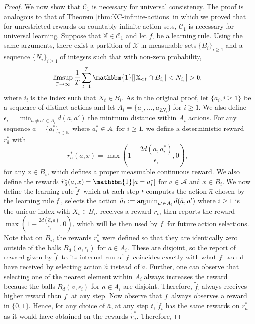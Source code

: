 \documentclass[aos]{imsart}
\theoremstyle{plain}
\theoremstyle{remark}
\newcommand{\Acal}{\mathcal{A}}
\newcommand{\Ccal}{\mathcal{C}}
\newcommand{\Xcal}{\mathcal{X}}
\newcommand{\Nbb}{\mathbb{N}}
\newcommand{\Xbb}{\mathbb{X}}
\newcommand{\1}{\mathbbm{1}}%
\newcommand{\argmin}{\mathop{\rm argmin}}
\renewcommand{\limsup}{\mathop{\rm limsup}}
\begin{document}
\begin{proof}
We now show that $\Ccal_1$ is necessary for universal consistency. The proof is analogous to that of Theorem \ref{thm:KC-infinite-actions} in which we proved that for unrestricted rewards on countably infinite action sets, $\Ccal_1$ is necessary for universal learning. Suppose that $\Xbb\in\Ccal_1$ and let $f_\cdot$ be a learning rule. Using the same arguments, there exist a partition of $\Xcal$ in measurable sets $\{B_i\}_{i\geq 1}$  and a sequence $\{N_i\}_{i\geq 1}$ of integers such that with non-zero probability,
\begin{equation*}
    \limsup_{T\to\infty} \frac{1}{T}\sum_{t=1}^T \1[|\Xbb_{<t}\cap B_{i_t}|<N_{i_t}] >0,
\end{equation*}
where $i_t$ is the index such that $X_t\in B_i$. As in the original proof, let $\{a_i,i\geq 1\}$ be a sequence of distinct actions and let $A_i=\{a_1,\ldots,a_{2N_i}\}$ for $i\geq 1$. We also define $\epsilon_i = \min_{a\neq a' \in A_i} d(a,a')$ the minimum distance within $A_i$ actions. For any sequence $\bar a=\{a_i^*\}_{i\in\Nbb}$ where $a_i^*\in A_i$ for $i\geq 1$, we define a deterministic reward $r^*_{\bar a}$ with
\begin{equation*}
    r^*_{\bar a}(a, x) = \max\left(1-\frac{2 d(a,a^*_i)}{\epsilon_i},0\right),
\end{equation*}
for any $x\in B_i$, which defines a proper measurable continuous reward. We also define the rewards $\tilde r^*_{\bar a}(a, x) = \1[a=a^*_i]$ for $a\in\Acal$ and $x\in B_i$. We now define the learning rule $\tilde f_\cdot$ which at each step $t$ computes the action $\hat a$ chosen by the learning rule $f_\cdot$, selects the action $\tilde a_t := \argmin_{a'\in A_i}d(\hat a,a')$ where $i\geq 1$ is the unique index with $X_t\in B_i$, receives a reward $r_t$, then reports the reward $\max\left(1-\frac{2 d(\hat a,\tilde a)}{\epsilon_i},0\right)$, which will be then used by $f_\cdot$ for future action selections. Note that on $B_i$, the rewards $r^*_{\bar a}$ were defined so that they are identically zero outside of the balls $B_d(a,\epsilon_i)$ for $a\in A_i$. These are disjoint, so the report of reward given by $\tilde f_\cdot$ to its internal run of $f_\cdot$ coincides exactly with what $f_\cdot$ would have received by selecting action $\hat a$ instead of $\tilde a$. Further, one can observe that selecting one of the nearest element within $A_i$ always increases the reward because the balls $B_d(a,\epsilon_i)$ for $a\in A_i$ are disjoint. Therefore, $\tilde f_\cdot$ always receives higher reward than $f_\cdot$ at any step. Now observe that $\tilde f_\cdot$ always observes a reward in $\{0,1\}$. Hence, for any choice of $\bar a$, at any step $t$, $\tilde f_t$ has the same rewards on $r^*_{\bar a}$ as it would have obtained on the rewards $\tilde r^*_{\bar a}$. Therefore,

\end{proof}
\end{document}

